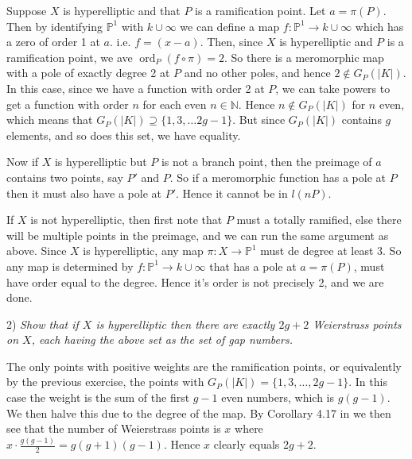 \documentclass[11pt]{article} %
\DeclareMathOperator{\ord}{ord}
\begin{document}
Suppose $X$ is hyperelliptic and that $P$ is a ramification point.
Let $a = \pi (P)$. 
Then by identifying $\mathbb P^1$ with $k\cup \infty$ we can define a map $f:\mathbb P^1 \rightarrow k\cup \infty$ which has a zero of order 1 at $a$. 
i.e. $f= (x-a)$.
Then, since $X$ is hyperelliptic and $P$ is a ramification point, we ave $\ord_P(f\circ \pi) = 2$.
So there is a meromorphic map with a pole of exactly degree 2 at $P$ and no other poles, and hence $2\notin G_P(|K|)$.
In this case, since we have a function with order 2 at $P$, we can take powers to get a function with order $n$ for each even $n \in \mathbb N$.
Hence $n \notin G_P(|K|)$ for $n$ even, which means that $G_P(|K|) \supseteq \{1,3,\ldots 2g-1\}$. 
But since $G_P(|K|)$ contains $g$ elements, and so does this set, we have equality.

Now if $X$ is hyperelliptic but $P$ is not a branch point, then the preimage of $a$ contains two points, say $P'$ and $P$.
So if a meromorphic function has a pole at $P$ then it must also have a pole at $P'$.
Hence it cannot be in $l(nP)$.


If $X$ is not hyperelliptic, then first note that $P$ must a totally ramified, else there will be multiple points in the preimage, and we can run the same argument as above.
Since $X$ is hyperelliptic, any map $\pi:X \rightarrow \mathbb P^1$ must de degree at least 3.
So any map is determined by $f:\mathbb P^1 \rightarrow k\cup \infty$ that has a pole at $a = \pi (P)$, must have order equal to the degree.
Hence it's order is not precisely 2, and we are done.

2) {\em Show that if $X$ is hyperelliptic then there are exactly $2g+2$ Weierstrass points on $X$, each having the above set as the set of gap numbers.}

The only points with positive weights are the ramification points, or equivalently by the previous exercise, the points with $G_P(|K|) = \{1,3,\ldots ,2g-1\}$.
In this case the weight is the sum of the first $g-1$ even numbers, which is $g(g-1)$. 
We then halve this due to the degree of the map.
By Corollary 4.17 in \cite[Ch. VII]{mir} we then see that the number of Weierstrass points is $x$ where $x\cdot \frac{g(g-1)}{2} = g(g+1)(g-1)$.
Hence $x$ clearly equals $2g+2$.





\end{document}
